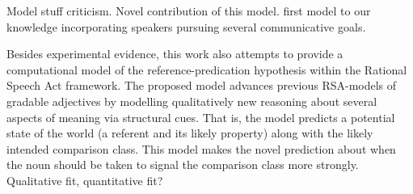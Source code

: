 
Model stuff criticism. 
Novel contribution of this model.   
first model to our knowledge incorporating speakers pursuing several communicative goals. 

Besides experimental evidence, this work also attempts to provide a computational model of the reference-predication hypothesis within the Rational Speech Act framework. The proposed model advances previous RSA-models of gradable adjectives by modelling qualitatively new reasoning about several aspects of meaning via structural cues. That is, the model predicts a potential state of the world (a referent and its likely property) along with the likely intended  comparison class.  This model makes the novel prediction about when the noun should be taken to signal the comparison class more strongly. Qualitative fit, quantitative fit?

